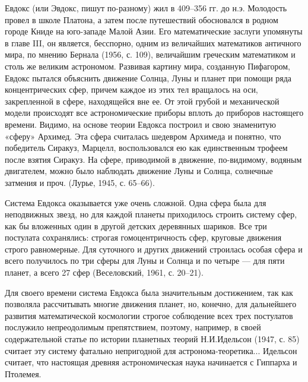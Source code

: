 Евдокс  (или  Эвдокс,   пишут  по-разному)  жил  в   409--356  гг.  до
н.э.  Молодость провел  в  школе Платона,  а  затем после  путешествий
обосновался  в   родном  городе   Книде  на  юго-западе   Малой  Азии.
Его  математические  заслуги  упомянуты  в  главе  III,  он  является,
бесспорно, одним  из величайших математиков античного  мира, по мнению
Бернала  (1956,  с. 109),  величайшим  греческим  математиком и  столь
же  великим астрономом.  Развивая картину  мира, созданную  Пифагором,
Евдокс пытался  объяснить движение  Солнца, Луны  и планет  при помощи
ряда  концентрических сфер,  причем каждое  из этих  тел вращалось  на
оси,  закрепленной в  сфере,  находящейся  вне ее.  От  этой грубой  и
механической модели  происходят все астрономические приборы  вплоть до
приборов настоящего времени. Видимо, на основе теории Евдокса построил
и  свою  знаменитую  «сферу»  Архимед. Эта  сфера  считалась  шедевром
Архимеда и понятно, что победитель Сиракуз, Марцелл, воспользовался ею
как единственным  трофеем после  взятия Сиракуз. На  сфере, приводимой
в  движение, по-видимому,  водяным  двигателем,  можно было  наблюдать
движение Луны  и Солнца, солнечные  затмения и проч. (Лурье,  1945, с.
65--66).

Система Евдокса  оказывается уже  очень сложной.  Одна сфера  была для
неподвижных звезд,  но для каждой планеты  приходилось строить систему
сфер, как бы  вложенных один в другой детских  деревянных шариков. Все
три  постулата сохранялись:  строгая  гомоцентричность сфер,  круговые
движения строго равномерные. Для суточного и других движений строилась
особая сфера и  всего получилось по три  сферы для Луны и  Солнца и по
четыре ---  для пяти планет,  а всего  27 сфер (Веселовский,  1961, с.
20--21).

Для своего времени система  Евдокса была значительным достижением, так
как позволяла  рассчитывать многие  движения планет, но,  конечно, для
дальнейшего  развития  математической  космологии  строгое  соблюдение
всех  трех постулатов  послужило непреодолимым  препятствием, поэтому,
например, в  своей содержательной  статье по истории  планетных теорий
Н.И.Идельсон (1947,  с. 85)  считает эту систему  фатально непригодной
для  астронома-теоретика... Идельсон  считает,  что настоящая  древняя
астрономическая наука начинается с Гиппарха и Птолемея.

